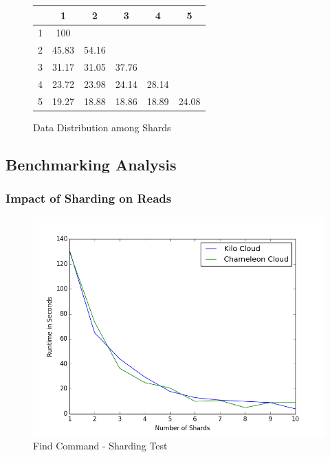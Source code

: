 \documentclass[9pt,twocolumn,twoside]{../../styles/osajnl}
\begin{document}
\begin{figure}[ht]
\begin{center}
 \begin{tabular}{| c | c | c | c | c | c |} 
 \hline
  &  1    &  2    &  3    &   4   & 5 \\ [0.5ex]
\hline
  \hline
1 & 100   &       &       &       &   \\
\hline
2 & 45.83 & 54.16 &       &       &   \\
\hline
3 & 31.17 & 31.05 & 37.76 &       &   \\
\hline
4 & 23.72 & 23.98 & 24.14 & 28.14 &   \\
\hline
5 & 19.27 & 18.88 & 18.86 & 18.89 & 24.08   \\
\hline
\end{tabular}
\end{center}
  \caption{Data Distribution among Shards}
\end{figure}





\subsection{Benchmarking Analysis}

\subsubsection{Impact of Sharding on Reads}

\begin{figure}[!ht]
  \includegraphics[scale=0.45]{images/shard_find.png}
  \caption{Find Command - Sharding Test}
\end{figure}
\end{document}
